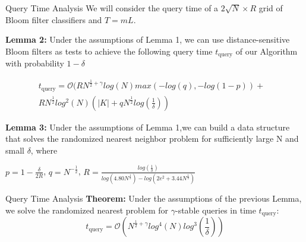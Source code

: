 \documentclass[Serif, 10pt, brown]{beamer}
\theoremstyle{example}
\theoremstyle{plain}
\begin{document}
\begin{frame}{Query Time Analysis}
	We will consider the query time of a $2\sqrt{N}\times R$ grid of Bloom filter classifiers and $T = mL$.

	\textbf{Lemma 2:} Under the assumptions of Lemma 1, we can use distance-sensitive Bloom filters as tests to achieve the following query time $t_\text{query}$ of our Algorithm with probability $1 - \delta$

	\[
	\begin{aligned}
		t_\text{query} =
		\mathcal{O}(RN^{\frac{1}{2} + \gamma}log(N) max(-log(q), -log(1-p)) 
	+ {} & \\
	RN^{\frac{1}{2}} log^2(N)(|K|+ qN^{\frac{1}{2}}log(\frac{1}{\delta})) &
	\end{aligned}
	\]

	\textbf{Lemma 3:} Under the assumptions of Lemma 1,we can build a data structure that solves the randomized nearest neighbor problem for sufficiently large N and small $\delta$, where

	$p = 1 - \frac{\delta}{2R}$, $q = N^{-\frac{1}{2}}$, $R = \frac{log(\frac{1}{\delta})}{log(4.80N^{\frac{1}{2}}) - log(2e^2 + 3.44N^{\frac{1}{2}})}$
\end{frame}

\begin{frame}{Query Time Analysis}
	\textbf{Theorem:} Under the assumptions of the previous Lemma, we solve the randomized nearest problem for $\gamma$-stable queries in time $t_\text{query}$:
	\[
		t_\text{query} = \mathcal{O}(N^{\frac{1}{2} + \gamma}log^4(N)log^3(\frac{1}{\delta}))
	\]
	
\end{frame}
\end{document}
